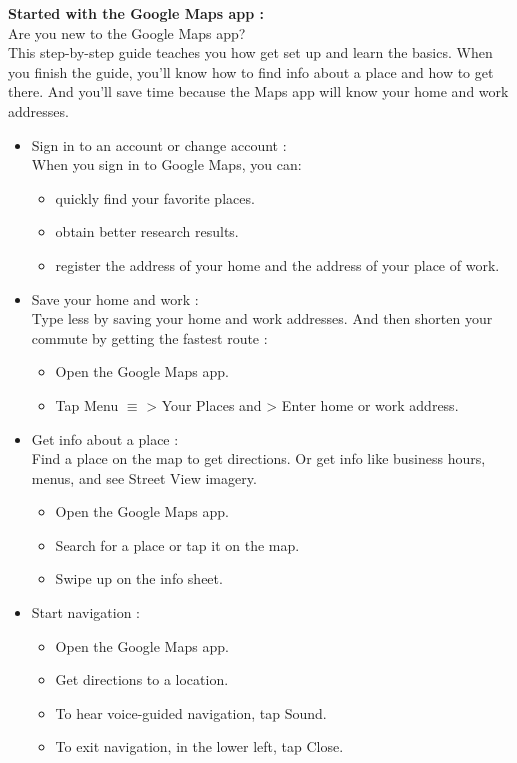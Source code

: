 \documentclass[10pt,a4paper]{report}
\begin{document}
\textbf{Started with the Google Maps app : }\\
Are you new to the Google Maps app?\\
This step-by-step guide teaches you how get set up and learn the basics.
When you finish the guide, you’ll know how to find info about a place and how to get there. And you’ll save time because the Maps app will know your home and work addresses.
\begin{itemize}
\item Sign in to an account or change account :\\
When you sign in to Google Maps, you can:
\begin{itemize}
\item quickly find your favorite places.
\item obtain better research results.
\item register the address of your home and the address of your place of work.
\end{itemize}

\item  Save your home and work :\\
Type less by saving your home and work addresses. And then shorten your commute by getting the fastest route :
\begin{itemize}
\item Open the Google Maps app.
\item Tap Menu $\equiv$ > Your Places and > Enter home or work address.
\end{itemize}
\item Get info about a place :\\
Find a place on the map to get directions. Or get info like business hours, menus, and see Street View imagery.
\begin{itemize}
\item Open the Google Maps app.
\item Search for a place or tap it on the map.
\item Swipe up on the info sheet.
\end{itemize}
\item Start navigation :
\begin{itemize}
\item Open the Google Maps app.
\item Get directions to a location.
\item To hear voice-guided navigation, tap Sound.
\item To exit navigation, in the lower left, tap Close.
\end{itemize}
\end{itemize}
\end{document}
